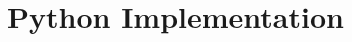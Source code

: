 \documentclass[../thesis.tex]{subfiles}
\begin{document}


\section{Python Implementation}\label{sec:pythonimpl}
\end{document}
